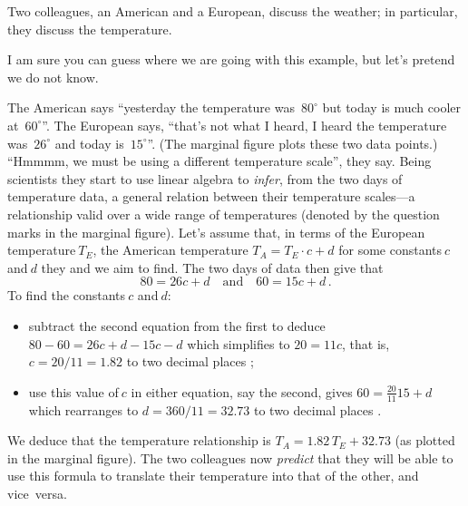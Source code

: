 \begin{example} \label{eg:infertemp}
Two colleagues, an American and a European, discuss the weather; in particular, they discuss the temperature.
\begin{aside}
I am sure you can guess where we are going with this example, but let's pretend we do not know.
\end{aside}
The American says ``yesterday the temperature was~\(80^\circ\) but today is much cooler at~\(60^\circ\)''.
The European says, ``that's not what I heard, I heard the temperature was~\(26^\circ\) and today is~\(15^\circ\)''.
(The marginal figure plots these two data points.)
%
``Hmmmm, we must be using a different temperature scale'', they say.
Being scientists they start to use linear algebra to \emph{infer}, from the two days of temperature data, a general relation between their temperature scales---a relationship valid over a wide range of temperatures (denoted by the question marks in the marginal figure).
Let's assume that, in terms of the European temperature\(~T_E\), the American temperature \(T_A=T_E\cdot c+d\) for some constants\(~c\) and\(~d\) they and we aim to find.
The two days of data then give that
\begin{equation*}
80=26c+d\quad\text{and}\quad 60=15c+d\,.
\end{equation*}
To find the constants\(~c\) and\(~d\):
\begin{itemize}
\item subtract the second equation from the first to deduce \(80-60=26c+d-15c-d\) which simplifies to \(20=11c\), that is, \(c=20/11=1.82\) to two decimal places \twodp;
\item use this value of\(~c\) in either equation, say the second, gives \(60=\frac{20}{11}15+d\) which rearranges to \(d=360/11=32.73\)  to two decimal places \twodp.
\end{itemize}
%
We deduce that the temperature relationship is \(T_A=1.82\,T_E+32.73\) (as plotted in the marginal figure).
The two colleagues now \emph{predict} that they will be able to use this formula to translate their temperature into that of the other, and vice~versa.


\end{example}
